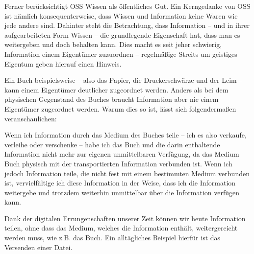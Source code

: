 \documentclass[a4paper]{article}
\begin{document}
\bigskip

{
Ferner ber\"ucksichtigt OSS Wissen als \"offentliches Gut. Ein
Kerngedanke von OSS ist n\"amlich konsequenterweise, dass Wissen und
Information keine Waren wie jede andere sind. Dahinter steht die
Betrachtung, dass Information -- und in ihrer aufgearbeiteten Form
Wissen -- die grundlegende Eigenschaft hat, dass man es weitergeben und
doch behalten kann. Dies macht es seit jeher schwierig, Information
einem Eigent\"umer zuzuordnen -- regelm\"a{\ss}ige Streits um geistiges
Eigentum geben hierauf einen Hinweis.}

{
Ein Buch beispielsweise -- also das Papier, die Druckerschw\"arze und
der Leim -- kann einem Eigent\"umer deutlicher zugeordnet werden.
Anders als bei dem physischen Gegenstand des Buches braucht Information
aber nie einem Eigent\"umer zugeordnet werden. Warum dies so ist,
l\"asst sich folgenderma{\ss}en veranschaulichen:}

{
Wenn ich Information durch das Medium des Buches teile -- ich es also
verkaufe, verleihe oder verschenke -- habe ich das Buch und die darin
enthaltende Information nicht mehr zur eigenen unmittelbaren
Verf\"ugung, da das Medium Buch physisch mit der transportierten
Information verbunden ist. Wenn ich jedoch Information teile, die nicht
fest mit einem bestimmten Medium verbunden ist, vervielf\"altige ich
diese Information in der Weise, dass ich die Information weitergebe und
trotzdem weiterhin unmittelbar \"uber die Information verf\"ugen kann.}

{
Dank der digitalen Errungenschaften unserer Zeit k\"onnen wir heute
Information teilen, ohne dass das Medium, welches die Information
enth\"alt, weitergereicht werden muss, wie z.B. das Buch. Ein
allt\"agliches Beispiel hierf\"ur ist das Versenden einer Datei.}
\end{document}
